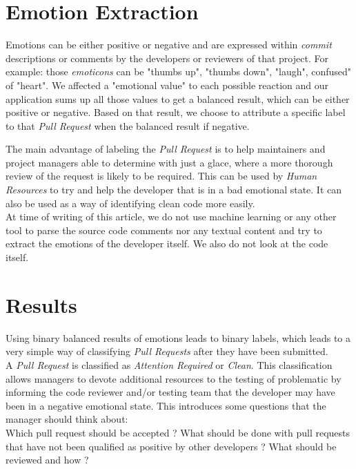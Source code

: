 \documentclass[journal]{IEEEtran}
\begin{document}
\section{Emotion Extraction}
Emotions can be either positive or negative and are expressed within \emph{commit} descriptions or comments by the developers or reviewers of that project. For example: those \emph{emoticons} can be "thumbs up", "thumbs down", "laugh", confused" of "heart". We affected a "emotional value" to each possible reaction and our application sums up all those values to get a balanced result, which can be either positive or negative. Based on that result, we choose to attribute a specific label to that \emph{Pull Request} when the balanced result if negative.

The main advantage of labeling the \emph{Pull Request} is to help maintainers and project managers able to determine with just a glace, where a more thorough review of the request is likely to be required. This can be used by \emph{Human Resources} to try and help the developer that is in a bad emotional state. It can also be used as a way of identifying clean code more easily.\\

At time of writing of this article, we do not use machine learning or any other tool to parse the source code comments nor any textual content and try to extract the emotions of the developer itself. We also do not look at the code itself.

\section{Results}
Using binary balanced results of emotions leads to binary labels, which leads to a very simple way of classifying \emph{Pull Requests} after they have been submitted.\\

A \emph{Pull Request} is classified as \emph{Attention Required} or \emph{Clean}. This classification allows managers to devote additional resources to the testing of problematic  by informing the code reviewer and/or testing team that the developer may have been in a negative emotional state. This introduces some questions that the manager should think about: \\
Which pull request should be accepted ? What should be done with pull requests that have not been qualified as positive by other developers ? What should be reviewed and how ?\\
\end{document}
